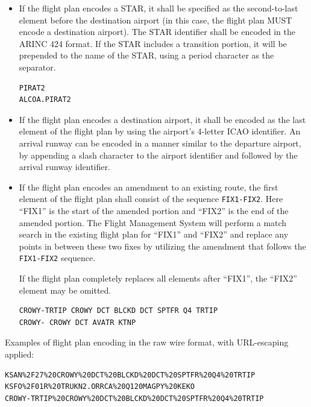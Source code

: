 \documentclass[a4paper,12pt]{article}
\begin{document}
\begin{description}
\begin{itemize}
\item If the flight plan encodes a STAR, it shall be specified as the
second-to-last element before the destination airport (in this case, the
flight plan MUST encode a destination airport). The STAR identifier shall
be encoded in the ARINC 424 format. If the STAR includes a transition
portion, it will be prepended to the name of the STAR, using a period
character as the separator.

\begin{verbatim}
PIRAT2
ALCOA.PIRAT2
\end{verbatim}

\item If the flight plan encodes a destination airport, it shall be
encoded as the last element of the flight plan by using the airport's
4-letter ICAO identifier. An arrival runway can be encoded in a manner
similar to the departure airport, by appending a slash character to the
airport identifier and followed by the arrival runway identifier.

\item If the flight plan encodes an amendment to an existing route,
the first element of the flight plan shall consist of the sequence
\texttt{FIX1-FIX2}. Here ``FIX1'' is the start of the amended portion
and ``FIX2'' is the end of the amended portion. The Flight Management
System will perform a match search in the existing flight plan for
``FIX1'' and ``FIX2'' and replace any points in between these two fixes
by utilizing the amendment that follows the \texttt{FIX1-FIX2} sequence.

If the flight plan completely replaces all elements after ``FIX1'', the
``FIX2'' element may be omitted.

\begin{verbatim}
CROWY-TRTIP CROWY DCT BLCKD DCT SPTFR Q4 TRTIP
CROWY- CROWY DCT AVATR KTNP
\end{verbatim}

\end{itemize}

Examples of flight plan encoding in the raw wire format, with URL-escaping
applied:

\begin{verbatim}
KSAN%2F27%20CROWY%20DCT%20BLCKD%20DCT%20SPTFR%20Q4%20TRTIP
KSFO%2F01R%20TRUKN2.ORRCA%20Q120MAGPY%20KEKO
CROWY-TRTIP%20CROWY%20DCT%20BLCKD%20DCT%20SPTFR%20Q4%20TRTIP
\end{verbatim}

\end{description}
\end{document}
